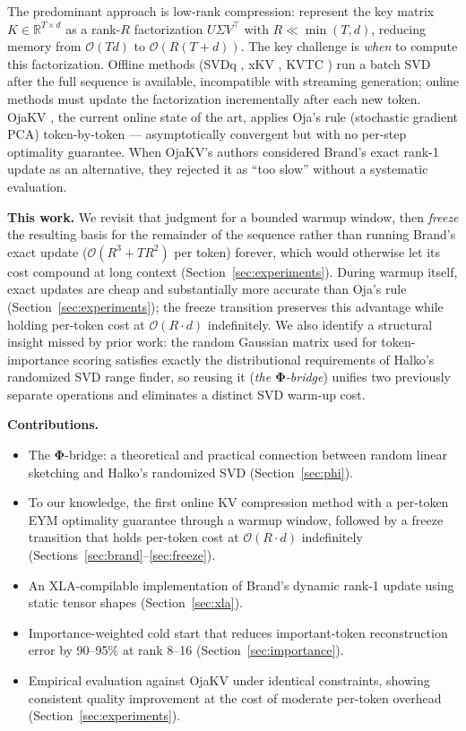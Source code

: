 \documentclass{article}
\newcommand{\R}{\mathbb{R}}
\let\PhiSymbol\Phi
\renewcommand{\Phi}{\boldsymbol{\PhiSymbol}}
\begin{document}
The predominant approach is low-rank compression: represent the key matrix
$K \in \R^{T \times d}$ as a rank-$R$ factorization $U \Sigma V^\top$ with
$R \ll \min(T, d)$, reducing memory from $\mathcal{O}(Td)$ to
$\mathcal{O}(R(T+d))$.  The key challenge is \emph{when} to compute this
factorization.  Offline methods (SVDq \citep{svdq2025}, xKV \citep{xkv2025},
KVTC \citep{kvtc2026}) run a batch SVD after the full sequence is
available, incompatible with streaming generation; online methods must
update the factorization incrementally after each new token.  OjaKV
\citep{ojakov2025}, the current online state of the art, applies Oja's
rule (stochastic gradient PCA) token-by-token --- asymptotically
convergent but with no per-step optimality guarantee.  When OjaKV's
authors considered Brand's exact rank-1 update as an alternative, they
rejected it as ``too slow'' without a systematic evaluation.

\textbf{This work.}  We revisit that judgment for a bounded warmup window,
then \emph{freeze} the resulting basis for the remainder of the sequence
rather than running Brand's exact update ($\mathcal{O}(R^3+TR^2)$ per
token) forever, which would otherwise let its cost compound at long
context (Section~\ref{sec:experiments}).  During warmup itself, exact
updates are cheap and substantially more accurate than Oja's rule
(Section~\ref{sec:experiments}); the freeze transition preserves this
advantage while holding per-token cost at $\mathcal{O}(R{\cdot}d)$
indefinitely.  We also identify a structural insight missed by prior
work: the random Gaussian matrix used for token-importance scoring
satisfies exactly the distributional requirements of Halko's randomized
SVD range finder, so reusing it (\emph{the $\Phi$-bridge}) unifies two
previously separate operations and eliminates a distinct SVD warm-up cost.

\textbf{Contributions.}
\begin{itemize}
  \item The $\Phi$-bridge: a theoretical and practical connection between
        random linear sketching and Halko's randomized SVD (Section~\ref{sec:phi}).
  \item To our knowledge, the first online KV compression method with a
        per-token EYM optimality guarantee through a warmup window, followed
        by a freeze transition that holds per-token cost at
        $\mathcal{O}(R{\cdot}d)$ indefinitely
        (Sections~\ref{sec:brand}--\ref{sec:freeze}).
  \item An XLA-compilable implementation of Brand's dynamic rank-1 update using
        static tensor shapes (Section~\ref{sec:xla}).
  \item Importance-weighted cold start that reduces important-token reconstruction
        error by 90--95\% at rank 8--16 (Section~\ref{sec:importance}).
  \item Empirical evaluation against OjaKV under identical constraints, showing
        consistent quality improvement at the cost of moderate per-token overhead
        (Section~\ref{sec:experiments}).
\end{itemize}
\end{document}

